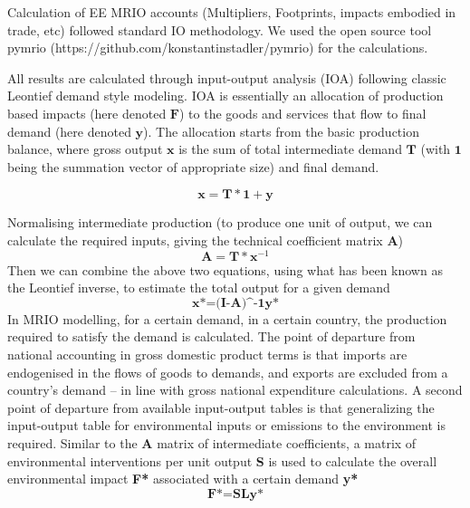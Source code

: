 Calculation of EE MRIO accounts (Multipliers, Footprints, impacts embodied in trade, etc) followed
standard IO methodology. We used the open source tool pymrio (https://github.com/konstantinstadler/pymrio) for the calculations.

All results are  calculated through input-output analysis (IOA) following classic Leontief demand style modeling. IOA is essentially an allocation of production based impacts (here denoted $\textbf{F}$) to the goods and services that flow to final demand (here denoted $\textbf{y}$). The allocation starts from the basic production balance, where gross output $\textbf{x}$ is the sum of total intermediate demand $\textbf{T}$ (with $\textbf{1}$ being the summation vector of appropriate size) and final demand. 

\begin{equation}
\textbf{x}=\textbf{T}*\textbf{1}+\textbf{y}
\end{equation}

Normalising intermediate production (to produce one unit of output, we can calculate the required inputs, giving the technical coefficient matrix $\textbf{A}$)
\begin{equation}
\textbf{A}=\textbf{T} * \textbf{x}^{-1}
\end{equation}
Then we can combine the above two equations, using what has been known as the Leontief inverse, to estimate the total output for a given demand
\begin{equation}
\textbf{x*={(I-A)^-1}y*}
\end{equation}
In MRIO modelling, for a certain demand, in a certain country, the production required to satisfy the demand is calculated. The point of departure from national accounting in gross domestic product terms is that imports are endogenised in the flows of goods to demands, and exports are excluded from a country’s demand – in line with gross national expenditure calculations. A second point of departure from available input-output tables is that generalizing the input-output table for environmental inputs or emissions to the environment is required. Similar to the \textbf{A} matrix of intermediate coefficients, a matrix of environmental interventions per unit output \textbf{S} is used to calculate the overall environmental impact \textbf{F*} associated with a certain demand \textbf{y*} 
\begin{equation}
\textbf{F*=SLy*}
\end{equation}